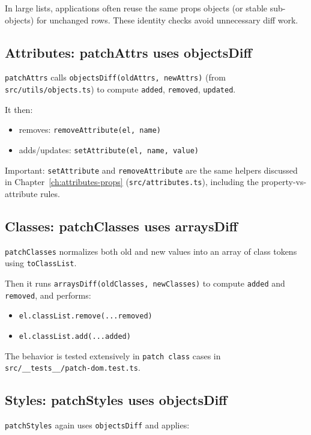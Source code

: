 In large lists, applications often reuse the same props objects (or stable sub-objects) for unchanged rows.
These identity checks avoid unnecessary diff work.

\subsection{Attributes: patchAttrs uses objectsDiff}

\texttt{patchAttrs} calls \texttt{objectsDiff(oldAttrs, newAttrs)} (from \texttt{src/utils/objects.ts}) to compute \texttt{added}, \texttt{removed}, \texttt{updated}.

It then:

\begin{itemize}
  \item removes: \texttt{removeAttribute(el, name)}
  \item adds/updates: \texttt{setAttribute(el, name, value)}
\end{itemize}

Important: \texttt{setAttribute} and \texttt{removeAttribute} are the same helpers discussed in Chapter~\ref{ch:attributes-props} (\texttt{src/attributes.ts}), including the property-vs-attribute rules.

\subsection{Classes: patchClasses uses arraysDiff}

\texttt{patchClasses} normalizes both old and new values into an array of class tokens using \texttt{toClassList}.

Then it runs \texttt{arraysDiff(oldClasses, newClasses)} to compute \texttt{added} and \texttt{removed}, and performs:

\begin{itemize}
  \item \texttt{el.classList.remove(...removed)}
  \item \texttt{el.classList.add(...added)}
\end{itemize}

The behavior is tested extensively in \texttt{patch class} cases in \texttt{src/\_\_tests\_\_/patch-dom.test.ts}.

\subsection{Styles: patchStyles uses objectsDiff}

\texttt{patchStyles} again uses \texttt{objectsDiff} and applies:

